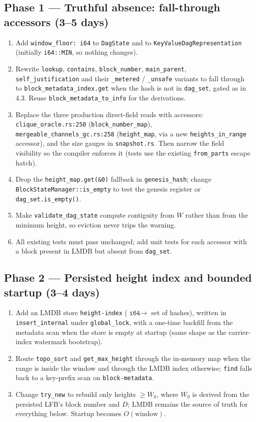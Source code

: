 \documentclass[11pt]{article}
\newcommand{\code}[1]{\texttt{#1}}
\begin{document}
\subsection*{Phase 1 --- Truthful absence: fall-through accessors (3--5 days)}
\begin{enumerate}
\item Add \code{window\_floor: i64} to \code{DagState} and to
  \code{KeyValueDagRepresentation} (initially \code{i64::MIN}, so nothing
  changes).
\item Rewrite \code{lookup}, \code{contains}, \code{block\_number},
  \code{main\_parent}, \code{self\_justification} and their
  \code{\_metered} / \code{\_unsafe} variants to fall through to
  \code{block\_metadata\_index.get} when the hash is not in \code{dag\_set},
  gated as in 4.3. Reuse \code{block\_metadata\_to\_info} for the derivations.
\item Replace the three production direct-field reads with accessors:
  \code{clique\_oracle.rs:250} (\code{block\_number\_map}),
  \code{mergeable\_channels\_gc.rs:258} (\code{height\_map}, via a new
  \code{heights\_in\_range} accessor), and the size gauges in
  \code{snapshot.rs}. Then narrow the field visibility so the compiler
  enforces it (tests use the existing \code{from\_parts} escape hatch).
\item Drop the \code{height\_map.get(\&0)} fallback in \code{genesis\_hash};
  change \code{BlockStateManager::is\_empty} to test the genesis register or
  \code{dag\_set.is\_empty()}.
\item Make \code{validate\_dag\_state} compute contiguity from $W$ rather than
  from the minimum height, so eviction never trips the warning.
\item All existing tests must pass unchanged; add unit tests for each
  accessor with a block present in LMDB but absent from \code{dag\_set}.
\end{enumerate}

\subsection*{Phase 2 --- Persisted height index and bounded startup (3--4 days)}
\begin{enumerate}
\item Add an LMDB store \code{height-index} ($\code{i64} \to$ set of hashes),
  written in \code{insert\_internal} under \code{global\_lock}, with a
  one-time backfill from the metadata scan when the store is empty at
  startup (same shape as the carrier-index watermark bootstrap).
\item Route \code{topo\_sort} and \code{get\_max\_height} through the
  in-memory map when the range is inside the window and through the LMDB
  index otherwise; \code{find} falls back to a key-prefix scan on
  \code{block-metadata}.
\item Change \code{try\_new} to rebuild only heights $\ge W_0$, where
  $W_0$ is derived from the persisted LFB's block number and $D$; LMDB
  remains the source of truth for everything below. Startup becomes
  $O(\text{window})$.
\end{enumerate}
\end{document}
